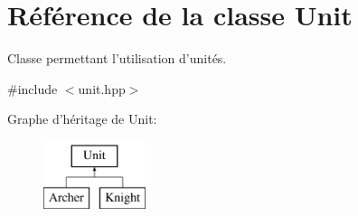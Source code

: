 \hypertarget{classUnit}{\section{Référence de la classe Unit}
\label{classUnit}
}


Classe permettant l'utilisation d'unités.  




{\ttfamily \#include $<$unit.\+hpp$>$}

Graphe d'héritage de Unit\+:\begin{figure}[H]
\begin{center}
\leavevmode
\includegraphics[height=2.000000cm]{classUnit}
\end{center}
\end{figure}
